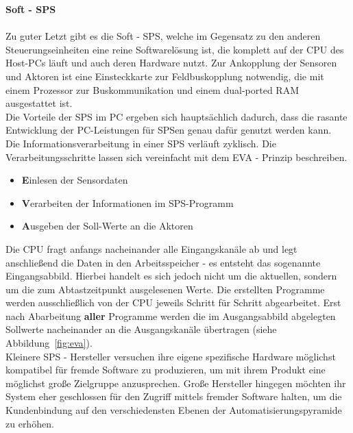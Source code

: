	\textbf{Soft - \ac{SPS}}\\\\
	Zu guter Letzt gibt es die Soft - \ac{SPS}, welche im Gegensatz zu den anderen Steuerungseinheiten eine reine Softwarelösung ist, die komplett auf der \ac{CPU} des Host-PCs läuft und auch deren Hardware nutzt. Zur Ankopplung der Sensoren und Aktoren ist eine Einsteckkarte zur Feldbuskopplung notwendig, die mit einem Prozessor zur Buskommunikation und einem dual-ported RAM ausgestattet ist.\\
	
	Die Vorteile der \ac{SPS} im PC ergeben sich hauptsächlich dadurch, dass die rasante Entwicklung der PC-Leistungen für \ac{SPS}en genau dafür genutzt werden kann.\\
	
	Die Informationsverarbeitung in einer \ac{SPS} verläuft zyklisch. Die Verarbeitungsschritte lassen sich vereinfacht mit dem EVA - Prinzip beschreiben.
	
	\begin{itemize}
		\item \textbf{E}inlesen der Sensordaten
		\item \textbf{V}erarbeiten der Informationen im \ac{SPS}-Programm
		\item \textbf{A}usgeben der Soll-Werte an die Aktoren
	\end{itemize}
	
	Die \ac{CPU} fragt anfangs nacheinander alle Eingangskanäle ab und legt anschließend die Daten in den Arbeitsspeicher - es entsteht das sogenannte \glqq Eingangsabbild\grqq. Hierbei handelt es sich jedoch nicht um die aktuellen, sondern um die zum Abtastzeitpunkt ausgelesenen Werte. Die erstellten Programme werden ausschließlich von der \ac{CPU} jeweils Schritt für Schritt abgearbeitet. Erst nach Abarbeitung \textbf{aller} Programme werden die im Ausgangsabbild abgelegten Sollwerte nacheinander an die Ausgangskanäle übertragen (siehe Abbildung~\ref{fig:eva}). \cite{mseitz_sps} \\ 
	
	Kleinere \ac{SPS} - Hersteller versuchen ihre eigene spezifische Hardware möglichst kompatibel für fremde Software zu produzieren, um mit ihrem Produkt eine möglichst große Zielgruppe anzusprechen. Große Hersteller hingegen möchten ihr System eher geschlossen für den Zugriff mittels fremder Software halten, um die Kundenbindung auf den verschiedensten Ebenen der Automatisierungspyramide zu erhöhen.
	
